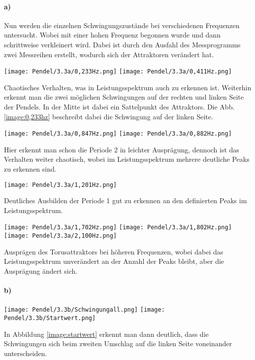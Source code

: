 \paragraph{a)}
Nun werden die einzelnen Schwingungszustände bei verschiedenen Frequenzen untersucht. Wobei mit einer hohen Frequenz begonnen wurde und dann schrittweise verkleinert wird. Dabei ist durch den Ausfahl des Messprogramms zwei Messreihen erstellt, wodurch sich der Attraktoren verändert hat. 
\begin{center}
    \texttt{[image: Pendel/3.3a/0,233Hz.png]}
    \label{image:0,233hz}
    \texttt{[image: Pendel/3.3a/0,411Hz.png]}
\end{center}
Chaotisches Verhalten, was in Leistungsspektrum auch zu erkennen ist. Weiterhin erkennt man die zwei möglichen Schwingungen auf der rechten und linken Seite der Pendels. In der Mitte ist dabei ein Sattelpunkt des Attraktors. Die Abb. \ref{image:0,233hz} beschreibt dabei die Schwingung auf der linken Seite.
\begin{center}
    \texttt{[image: Pendel/3.3a/0,847Hz.png]}
    \texttt{[image: Pendel/3.3a/0,882Hz.png]}
\end{center}
Hier erkennt man schon die Periode 2 in leichter Ausprägung, dennoch ist das Verhalten weiter chaotisch, wobei im Leistungsspektrum mehrere deutliche Peaks zu erkennen sind.
\begin{center}
    \texttt{[image: Pendel/3.3a/1,201Hz.png]}
\end{center}
Deutliches Ausbilden der Periode 1 gut zu erkennen an den definierten Peaks im Leistungsspektrum.
\begin{center}
    \texttt{[image: Pendel/3.3a/1,702Hz.png]}
    \texttt{[image: Pendel/3.3a/1,802Hz.png]}
    \texttt{[image: Pendel/3.3a/2,100Hz.png]}
\end{center}
Ausprägen des Torusattraktors bei höheren Frequenzen, wobei dabei das Leistungsspektrum unverändert an der Anzahl der Peaks bleibt, aber die Ausprägung ändert sich.
\newpage
\paragraph{b)}
\begin{center}
    \texttt{[image: Pendel/3.3b/Schwingungall.png]}
    \texttt{[image: Pendel/3.3b/Startwert.png]}
    \label{image:startwert}
\end{center}
In Abbildung \ref{image:startwert} erkennt man dann deutlich, dass die Schwingungen sich beim zweiten Umschlag auf die linken Seite voneinander unterscheiden. 